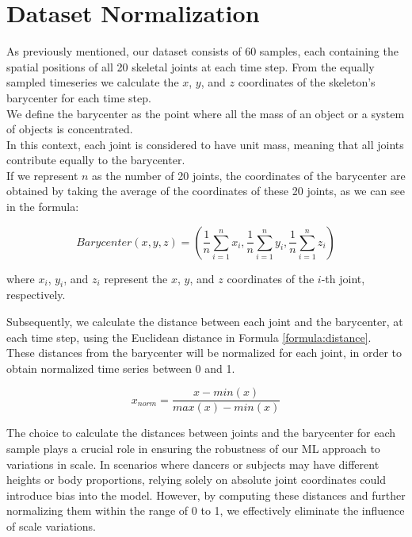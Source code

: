 \section{Dataset Normalization}
As previously mentioned, our dataset consists of 60 samples, each containing the spatial positions of all 20 skeletal joints at each time step.
From the equally sampled timeseries we calculate the $x$, $y$, and $z$ coordinates of the skeleton's barycenter for each time step. \\
We define the barycenter as the point where all the mass of an object or a system of objects is concentrated. \\
In this context, each joint is considered to have unit mass, meaning that all joints contribute equally to the barycenter. \\
If we represent $n$ as the number of 20 joints, the coordinates of the barycenter are obtained by taking the average of the coordinates of these 20 joints, as we can see in the formula:


\begin{equation}
    Barycenter (x, y, z) = \left(\frac{1}{n} \sum_{i=1}^{n} x_i, \frac{1}{n} \sum_{i=1}^{n} y_i, \frac{1}{n} \sum_{i=1}^{n} z_i\right)
    \label{formula:baricentro}
\end{equation}
    
where $x_i$, $y_i$, and $z_i$ represent the $x$, $y$, and $z$ coordinates of the $i$-th joint, respectively.

Subsequently, we calculate the distance between each joint and the barycenter, at each time step, using the Euclidean distance in Formula \ref{formula:distance}. \\
These distances from the barycenter will be normalized for each joint, in order to obtain normalized time series between 0 and 1.

\begin{equation}
    x_{norm} = \frac{{x - min(x)}}{{max(x) - min(x)}}
    \label{formula:normalization}
\end{equation}
    
The choice to calculate the distances between joints and the barycenter for each sample plays a crucial role in ensuring the robustness of our ML approach to variations in scale.
In scenarios where dancers or subjects may have different heights or body proportions, relying solely on absolute joint coordinates could introduce bias into the model.
However, by computing these distances and further normalizing them within the range of 0 to 1, we effectively eliminate the influence of scale variations.

